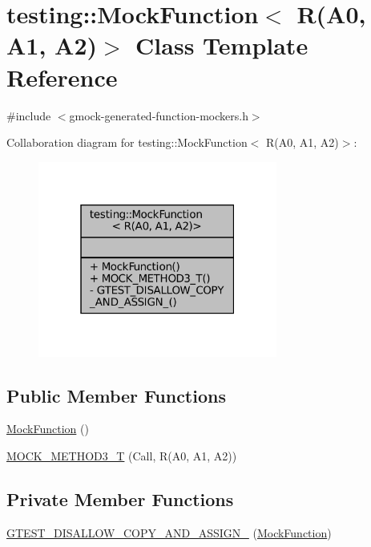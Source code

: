 \hypertarget{classtesting_1_1MockFunction_3_01R_07A0_00_01A1_00_01A2_08_4}{}\section{testing\+:\+:Mock\+Function$<$ R(A0, A1, A2)$>$ Class Template Reference}
\label{classtesting_1_1MockFunction_3_01R_07A0_00_01A1_00_01A2_08_4}


{\ttfamily \#include $<$gmock-\/generated-\/function-\/mockers.\+h$>$}



Collaboration diagram for testing\+:\+:Mock\+Function$<$ R(A0, A1, A2)$>$\+:
\nopagebreak
\begin{figure}[H]
\begin{center}
\leavevmode
\includegraphics[width=223pt]{classtesting_1_1MockFunction_3_01R_07A0_00_01A1_00_01A2_08_4__coll__graph}
\end{center}
\end{figure}
\subsection*{Public Member Functions}
\begin{DoxyCompactItemize}
\item 
\hyperlink{classtesting_1_1MockFunction_3_01R_07A0_00_01A1_00_01A2_08_4_a33e409a6528b41103fe36844e4bb2bfe}{Mock\+Function} ()
\item 
\hyperlink{classtesting_1_1MockFunction_3_01R_07A0_00_01A1_00_01A2_08_4_afcc79eab94b7d873f71ccf7b08ce582f}{M\+O\+C\+K\+\_\+\+M\+E\+T\+H\+O\+D3\+\_\+T} (Call, R(A0, A1, A2))
\end{DoxyCompactItemize}
\subsection*{Private Member Functions}
\begin{DoxyCompactItemize}
\item 
\hyperlink{classtesting_1_1MockFunction_3_01R_07A0_00_01A1_00_01A2_08_4_acf04153a26d9b03d0f3bf1abf9fdb694}{G\+T\+E\+S\+T\+\_\+\+D\+I\+S\+A\+L\+L\+O\+W\+\_\+\+C\+O\+P\+Y\+\_\+\+A\+N\+D\+\_\+\+A\+S\+S\+I\+G\+N\+\_\+} (\hyperlink{classtesting_1_1MockFunction}{Mock\+Function})
\end{DoxyCompactItemize}


